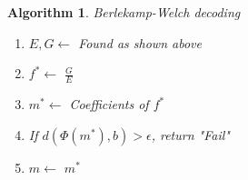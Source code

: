 \documentclass{article}
\newtheorem{algorithm}[theorem]{Algorithm}
\begin{document}
\begin{algorithm} Berlekamp-Welch decoding
    \begin{enumerate}
        \item $E,G \leftarrow$ Found as shown above
        \item $f^* \leftarrow$ $\frac{G}{E}$
        \item $m^* \leftarrow$ Coefficients of $f^*$
        \item If $d(\Phi(m^*),b)>\epsilon$, return "Fail"
        \item $m \leftarrow$ $m^*$
    \end{enumerate}
\end{algorithm}
\end{document}
